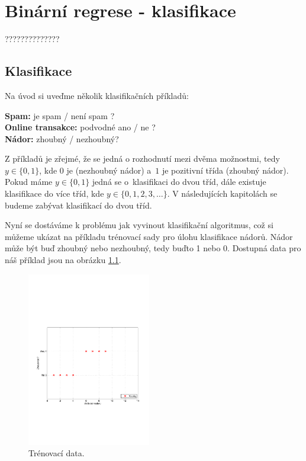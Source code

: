 

\chapter{Binární regrese - klasifikace}
\label{sec:BinarniRegrese}

\par{??????????????}













\section{Klasifikace}
\label{sec:BinarniRegreseKlasifikace}

\par{Na úvod si uveďme několik klasifikačních příkladů:
\begin{center}
	\textbf{Spam:} je spam / není spam ?\\
	\textbf{Online transakce:} podvodné ano / ne ?\\
	\textbf{Nádor:} zhoubný / nezhoubný?
\end{center}
Z příkladů je zřejmé, že se jedná o rozhodnutí mezi dvěma možnostmi, tedy $y \in \{ 0, 1 \}$, kde $0$ je  (nezhoubný nádor) a~$1$ je pozitivní třída (zhoubný nádor). Pokud máme $y \in \{ 0, 1 \}$ jedná se o~klasifikaci do dvou tříd, dále existuje klasifikace do více tříd, kde $y \in \{ 0, 1, 2, 3, \ldots \}$. V následujících kapitolách se budeme zabývat klasifikací do dvou tříd.}
\par{Nyní se dostáváme k problému jak vyvinout klasifikační algoritmus, což si můžeme ukázat na příkladu trénovací sady pro úlohu klasifikace nádorů. Nádor může být buď zhoubný nebo nezhoubný, tedy buďto 1 nebo 0. Dostupná data pro náš příklad jsou na obrázku \ref{fig:nadory1}.
\begin{figure}[!ht]
	\centering
	\includegraphics[width = 0.48\textwidth, trim = 2.5cm 7cm 2cm 9cm]{./Img/BinarniRegrese/prikladNadory/tumor_1st_example.pdf}
	\caption{Trénovací data.}
	\label{fig:nadory1}
\end{figure}}
\pagebreak

